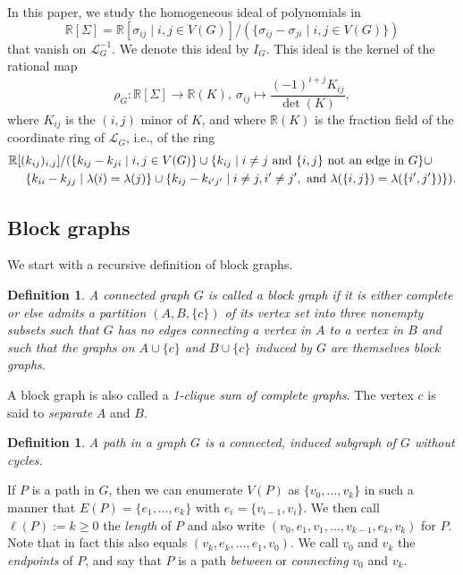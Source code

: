 \documentclass[a4paper, 11pt]{amsart}
\numberwithin{theorem}{section}
\newtheorem{definition}[theorem]{Definition}
\newcommand{\cL}{\mathcal{L}}
\def\R{{\mathbb R}}
\begin{document}
In this paper, we study the homogeneous ideal of polynomials
in 
\[\R [\Sigma] = \R [\sigma_{ij} \mid i,j \in
V(G)]/(\{\sigma_{ij}-\sigma_{ji} \mid i,j \in V(G)\}) 
\]
 that vanish on
$\mathcal{L}_G^{-1}$. We denote this ideal by $I_G$.  This ideal is the
kernel of the rational map
\[
  \rho _G : \R[\Sigma]  \to \R (K), \ 
  \sigma_{ij}  \mapsto \frac{(-1)^{i+j}K_{ij}}{\det (K)},  
\]
where $K_{ij} $ is the $(i,j)$ minor of $K$, and where $\R(K)$ is the
fraction field of the coordinate ring of $\cL_G$, i.e., of the
ring
\begin{align}
\R[(&k_{ij})_{i,j}]/(
\{k_{ij}-k_{ji} \mid i,j \in V(G)\} \cup 
\{k_{ij} \mid i \neq j \text{ and } \{i,j\} \text{ not an edge in
$G$}\} \cup \label{eq:RingK} \\
&\{k_{ii}-k_{jj} \mid \lambda(i)=\lambda(j)\} \cup
\{k_{ij}-k_{i'j'} \mid i \neq j, i' \neq j', \text{ and }
\lambda(\{i,j\})=\lambda(\{i',j'\})\}). \notag 
\end{align}

\subsection{Block graphs}

We start with a recursive definition of block graphs.

\begin{definition}
    A connected graph $G$ is called a {\em block graph} if it is either
    complete or else admits a partition $(A,B,\{c\}
    ) $ of its vertex set into three nonempty subsets such that $G$ has
    no edges connecting a vertex in $A$ to a vertex in $B$ and such that
    the graphs on $A \cup \{c\}$ and $B \cup \{c\}$ induced by $G$
    are themselves block graphs.
\end{definition}

A block graph is also called a {\em 1-clique sum of complete graphs}.
The vertex $c$ is said to {\em separate} $A$ and $B$.

\begin{definition}
A {\em path} in a graph $G$ is a connected, induced subgraph of $G$ without
cycles. 
\end{definition}

If $P$ is a path in $G$, then we can enumerate $V(P)$ as
$\{v_0,\ldots,v_k\}$ in such a manner that $E(P)=\{e_1,\ldots,e_k\}$
with $e_i=\{v_{i-1},v_i\}$. We then call $\ell(P):=k \geq 0$ the {\em
length} of $P$ and also write $(v_0,e_1,v_1,\ldots,v_{k-1},e_k,v_k)$ for
$P$. Note that in fact this also equals $(v_k,e_k,\ldots,e_1,v_0)$. We
call $v_0$ and $v_k$ the {\em endpoints} of $P$, and say that $P$ is a
path {\em between} or {\em connecting} $v_0$ and $v_k$.
\end{document}
